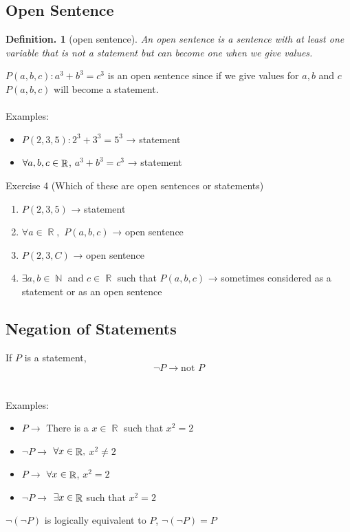 \documentclass[11pt, a4paper]{memoir}
\DeclareMathOperator{\N}{{\mathbb{N}}}
\DeclareMathOperator{\R}{{\mathbb{R}}}
\theoremstyle{change}
\theoremstyle{plain}
\theoremstyle{nonumberplain}
\newtheorem{definition}{Definition.}
\numberwithin{equation}{section}
\begin{document}
\subsection{Open Sentence}
\begin{definition}[open sentence]
    An open sentence is a sentence with at least one variable that is not a statement but can become one when we give values.
\end{definition}
$P(a, b, c): a^3 + b^3 = c^3$ is an open sentence since if we give values for $a, b $ and $c$ $P(a,b , c) $ will become a statement. 
\\ \vspace{1ex} \\
Examples:
\begin{itemize}
    \item $P(2, 3 ,5): 2^3 + 3^3 = 5^3$ → statement
    \item $\forall \space a, b, c \in \R$,  $a^3 + b^3 = c^3$  → statement
\end{itemize} 
Exercise 4 (Which of these are open sentences or statements)
\begin{enumerate}
    \item $P(2, 3, 5)$ → statement
    \item $\forall a \in \R,$   $P(a, b , c)$ → open sentence
    \item $P(2, 3, C)$ → open sentence
    \item $\exists a, b \in \N$ and $c \in \R$ such that $P(a, b, c)$ → sometimes considered as a statement or as an open sentence
\end{enumerate}
\subsection{Negation of Statements}
If $P$ is a statement, $$\neg P \to \text{not }P$$
\\ \; \\
Examples:
\begin{itemize}
    \item $P \to$  There is a $x \in \R$ such that $x^2 = 2$
    \item $\neg P \to$  $\forall \space x \in \R,$   $x^2 \ne 2$
    \item $P \to$  $\forall \space x \in \R$,   $x^2 = 2$
    \item $\neg P \to$  $\exists \space x \in \R$ such that $x^2 = 2$
\end{itemize}
$\neg (\neg P)$ is logically equivalent to $P$, $\neg (\neg P) = P$
\end{document}
